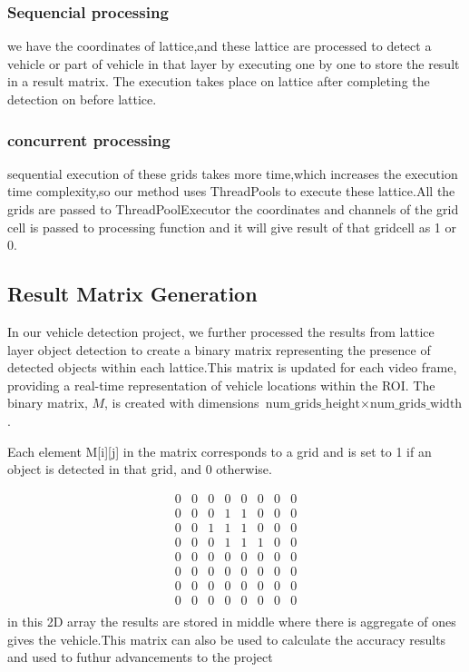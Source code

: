 \documentclass[conference]{IEEEtran}
\begin{document}
\subsubsection{Sequencial processing}
we have the coordinates of lattice,and these lattice are processed to detect a vehicle or part of vehicle in that layer by executing one by one to store the result in a result matrix. The execution takes place on lattice after completing the detection on before lattice.
\subsubsection{concurrent processing}
sequential execution of these grids takes more time,which increases the execution time complexity,so our method uses ThreadPools to execute these lattice.All the grids are passed to ThreadPoolExecutor the coordinates and channels of the grid cell is passed to processing function and it will give result of that gridcell as 1 or 0.

\subsection{Result Matrix Generation}
In our vehicle detection project, we further processed the results from lattice layer object detection to create a binary matrix representing the presence of detected objects within each
lattice.This matrix is updated for each video frame, providing a real-time representation of vehicle locations within the ROI.
The binary matrix, $M$, is created with dimensions $\text{num\_grids\_height} \times \text{num\_grids\_width}$.

Each element M[i][j] in the matrix corresponds to a grid and is set to 1 if an object is detected
in that grid, and 0 otherwise.

\[
\begin{array}{cccccccc}
0 & 0 & 0 & 0 & 0 & 0 & 0 & 0 \\
0 & 0 & 0 & 1 & 1 & 0 & 0 & 0 \\
0 & 0 & 1 & 1 & 1 & 0 & 0 & 0 \\
0 & 0 & 0 & 1 & 1 & 1 & 0 & 0 \\
0 & 0 & 0 & 0 & 0 & 0 & 0 & 0 \\
0 & 0 & 0 & 0 & 0 & 0 & 0 & 0 \\
0 & 0 & 0 & 0 & 0 & 0 & 0 & 0 \\
0 & 0 & 0 & 0 & 0 & 0 & 0 & 0 \\
\end{array}
\]
in this 2D array the results are stored in middle where there is aggregate of ones gives the vehicle.This matrix can also be used to calculate the accuracy results and used to futhur advancements to the project
\end{document}
